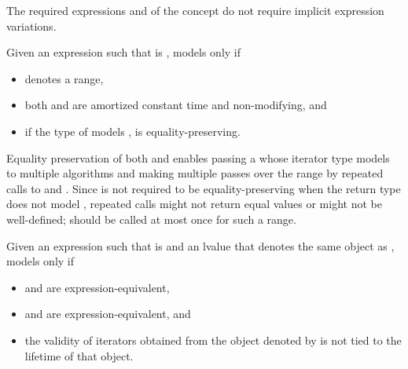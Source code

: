 \begin{itemdescr}
\pnum
The required expressions
and
of the  concept
do not require implicit expression variations.

\pnum
Given an expression  such that  is ,
 models  only if

\begin{itemize}
\item {}
  denotes a range,

\item both
and
are amortized constant time and non-modifying, and

\item if the type of  models
,  is equality-preserving.
\end{itemize}

\pnum
\begin{note}
Equality preservation of both  and
 enables passing a  whose iterator
type models  to multiple
algorithms and making multiple passes over the range by repeated calls to
 and .
Since  is not required to be equality-preserving
when the return type does not model , repeated calls
might not return equal values or might not be well-defined;
 should be called at most once for such a range.
\end{note}

\pnum
Given an expression  such that  is 
and an lvalue  that denotes the same object as ,
 models  only if
\begin{itemize}
\item {} and 
  are expression-equivalent,
\item {} and 
  are expression-equivalent, and
\item the validity of iterators obtained from the object denoted
  by  is not tied to the lifetime of that object.
\end{itemize}


\end{itemdescr}
